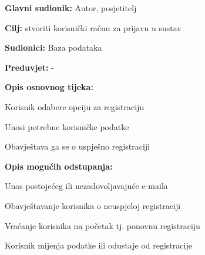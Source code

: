 					\noindent {}
					\begin{packed_item}
	
						\item \textbf{Glavni sudionik: }Autor, posjetitelj
						\item  \textbf{Cilj:} stvoriti korisnički račun za prijavu u sustav
						\item  \textbf{Sudionici:} Baza podataka
						\item  \textbf{Preduvjet:} -
						\item  \textbf{Opis osnovnog tijeka:}
						
						\item[] \begin{packed_enum}
	
							\item Korisnik odabere opciju za registraciju
							\item Unosi potrebne korisničke podatke
							\item Obavještava ga se o uspješno registraciji
						\end{packed_enum}
						
						\item  \textbf{Opis mogućih odstupanja:}
						
						\item[] \begin{packed_item}
	
							\item Unos postojećeg ili nezadovoljavajuće e-maila

							\item[] \begin{packed_enum}
								
								\item Obavještavanje korisnika o neuspjeloj registraciji
								\item Vraćanje korisnika na početak tj. ponovnu registraciju
								\item Korisnik mijenja podatke ili odustaje od registracije
								
							\end{packed_enum}
							
						\end{packed_item}
					\end{packed_item}

